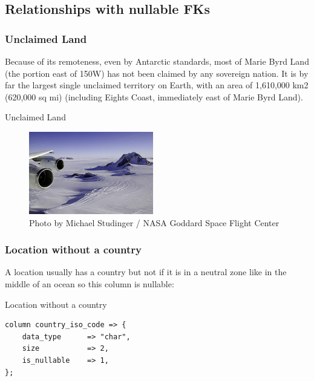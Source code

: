 \subsection{Relationships with nullable FKs}


\subsubsection{Unclaimed Land}

Because of its remoteness, even by Antarctic standards, most of Marie Byrd
Land (the portion east of 150\degree{}W) has not been claimed by any sovereign
nation. It is by far the largest single unclaimed territory on Earth, with
an area of 1,610,000 km2 (620,000 sq mi) (including Eights Coast,
immediately east of Marie Byrd Land).

\begin{frame}{Unclaimed Land}
  \begin{figure}[!ht]
    \begin{center}
\includegraphics{img/Marie_Byrd_Land.jpg}
\caption[Marie Byrd Land]{Photo by Michael Studinger / NASA
  Goddard Space Flight Center}
    \end{center}
\end{figure}
\end{frame}

\subsubsection{Location without a country}

A location usually has a country but not if it is in a neutral zone like in
the middle of an ocean so this column is nullable:

\begin{frame}[fragile]{Location without a country}
\begin{lstlisting}
column country_iso_code => {
    data_type      => "char",
    size           => 2,
    is_nullable    => 1,
};
\end{lstlisting}
\end{frame}

